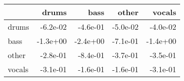 \begin{tabular}{lrrrr}
\toprule
{} &    drums &     bass &    other &   vocals \\
\midrule
drums  & -6.2e-02 & -4.6e-01 & -5.0e-02 & -4.0e-02 \\
bass   & -1.3e+00 & -2.4e+00 & -7.1e-01 & -1.4e+00 \\
other  & -2.8e-01 & -8.4e-01 & -3.7e-01 & -3.5e-01 \\
vocals & -3.1e-01 & -1.6e-01 & -1.6e-01 & -3.1e-01 \\
\bottomrule
\end{tabular}
